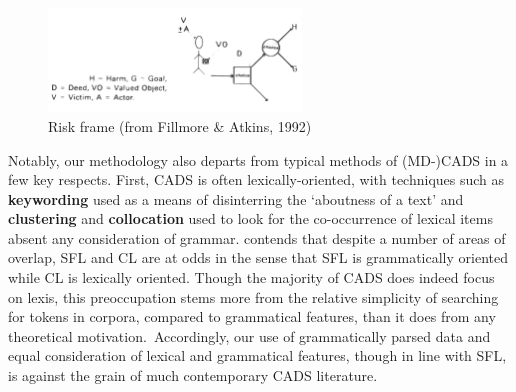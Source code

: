 \begin{figure}[htb!]
\centering
\includegraphics[width=0.6\textwidth]{../images/riskframe.png}
\caption[Risk frame]{Risk frame (from Fillmore \& Atkins, 1992)}
\label{fig:fil_atk}
\end{figure}



Notably, our methodology also departs from typical methods of (MD-)CADS in a few key respects. First, CADS is often lexically-oriented, with techniques such as \textbf{keywording} used as a means of disinterring the `aboutness of a text' \cite{baker_querying_2004} and \textbf{clustering} and \textbf{collocation} used to look for the co-occurrence of lexical items absent any consideration of grammar.  contends that despite a number of areas of overlap, SFL and CL are at odds in the sense that SFL is grammatically oriented while CL is lexically oriented. Though the majority of CADS does indeed focus on lexis, this preoccupation stems more from the relative simplicity of searching for tokens in corpora, compared to grammatical features, than it does from any theoretical motivation.~Accordingly, our use of grammatically parsed data and equal consideration of lexical and grammatical features, though in line with SFL, is against the grain of much contemporary CADS literature.

